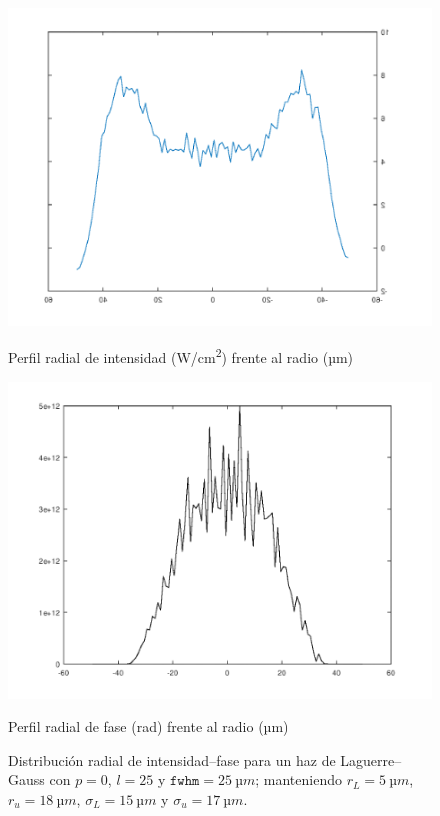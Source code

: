 \begin{figure}[htbp]
  \centering
  \begin{subcaptionblock}{.4\textwidth}
    \centering
    \includegraphics[width=\textwidth]{Figuras/anx_oamfs_3.png}
    \caption*{Perfil radial de intensidad (\unit{W/cm^2}) frente al radio (\unit{µm})}
  \end{subcaptionblock}
  \begin{subcaptionblock}{.4\textwidth}
    \centering
    \includegraphics[width=\textwidth]{Figuras/anx_oamint_3.png}
    \caption*{Perfil radial de fase (\unit{rad}) frente al radio (\unit{µm})}
  \end{subcaptionblock}
   \caption*{Distribución radial de intensidad--fase para un haz de Laguerre--Gauss con $p=0$, $l=25$ y $\texttt{fwhm}=\qty{25}{µm}$; manteniendo $r_{L}=\qty{5}{µm}$, $r_{u}=\qty{18}{µm}$, $\sigma_{L}=\qty{15}{µm}$ y $\sigma_{u}=\qty{17}{µm}$.}
\end{figure}

